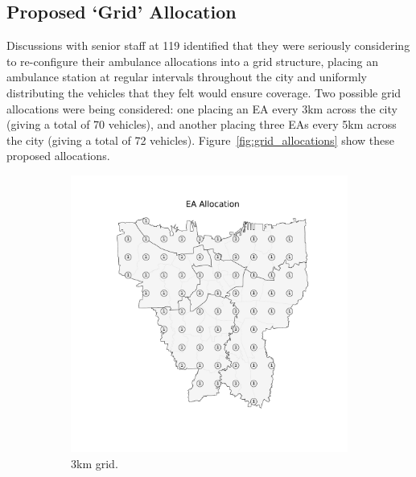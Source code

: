 \documentclass[preprint,12pt]{elsarticle}
\begin{document}
\subsection{Proposed `Grid' Allocation}\label{sec:analysis_grid}
Discussions with senior staff at 119 identified that they were seriously
considering to re-configure their ambulance allocations into a grid structure,
placing an ambulance station at regular intervals throughout the city and
uniformly distributing the vehicles that they felt would ensure coverage. Two
possible grid allocations were being considered: one placing an EA every 3km
across the city (giving a total of 70 vehicles), and another placing three EAs
every 5km across the city (giving a total of 72 vehicles).
Figure~\ref{fig:grid_allocations} show these proposed allocations.

\begin{figure}
\begin{center}
\begin{subfigure}{0.48\textwidth}
\includegraphics[width=\textwidth]{img/map_grid3km_proposed}
\caption{3km grid.}
\end{subfigure}
\hfill
\begin{subfigure}{0.48\textwidth}

\end{subfigure}
\end{center}
\end{figure}
\end{document}
